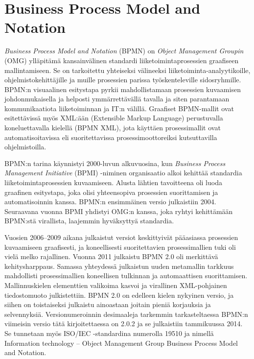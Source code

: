 \documentclass[
  finnish,
  letterpaper,
  DIV=11,
  numbers=noendperiod,
  oneside]{scrreprt}
\begin{document}
\section{Business Process Model and
Notation}\label{business-process-model-and-notation}

\emph{Business Process Model and Notation}
(BPMN) on \emph{Object Management Groupin}
(OMG) ylläpitämä kansainvälinen standardi liiketoimintaprosessien
graafiseen mallintamiseen. Se on tarkoitettu yhteiseksi välineeksi
liiketoiminta-analyytikoille, ohjelmistokehittäjille ja muille
prosessien parissa työskenteleville sidosryhmille. BPMN:n visuaalinen
esitystapa pyrkii mahdollistamaan prosessien kuvaamisen johdonmukaisella
ja helposti ymmärrettävällä tavalla ja siten parantamaan kommunikaatiota
liiketoiminnan ja IT:n välillä. Graafiset BPMN-mallit ovat
esitettävissä myös XML:ään (Extensible Markup Language) perustuvalla
koneluettavalla kielellä (BPMN XML), jota käyttäen prosessimallit ovat
automatisoitavissa eli suoritettavissa prosessimoottoreiksi
kutsuttavilla ohjelmistoilla.

BPMN:n tarina käynnistyi 2000-luvun alkuvuosina, kun \emph{Business
Process Management Initiative} (BPMI) -niminen organisaatio alkoi
kehittää standardia liiketoimintaprosessien kuvaamiseen. Alusta lähtien
tavoitteena oli luoda graafinen esitystapa, joka olisi yhteensopiva
prosessien suorittamisen ja automatisoinnin kanssa. BPMN:n ensimmäinen
versio julkaistiin 2004. Seuraavana vuonna BPMI yhdistyi OMG:n kanssa,
joka ryhtyi kehittämään BPMN:stä virallista, laajemmin hyväksyttyä
standardia.

Vuosien 2006--2009 aikana julkaistut versiot keskittyivät pääasiassa
prosessien kuvaamiseen graafisesti, ja koneellisesti suoritettavien
prosessimallien tuki oli vielä melko rajallinen. Vuonna 2011 julkaistu
BPMN 2.0 oli merkittävä kehitysharppaus. Samassa yhteydessä julkaistun
uuden metamallin tarkkuus mahdollisti prosessimallien koneellisen
tulkinnan ja automaattisen suorittamisen. Mallinnuskielen elementtien
valikoima kasvoi ja virallinen XML-pohjainen tiedostomuoto
julkistettiin. BPMN 2.0 on edelleen kielen nykyinen versio, ja siihen on
toistaiseksi julkaistu ainoastaan joitain pieniä korjauksia ja
selvennyksiä. Versionumeroinnin desimaaleja tarkemmin tarkasteltaessa
BPMN:n viimeisin versio tätä kirjoitettaessa on 2.0.2 ja se julkaistiin
tammikuussa 2014. Se tunnetaan myös ISO/IEC -standardina numerolla 19510
ja nimellä Information technology -- Object Management Group Business
Process Model and Notation.
\end{document}
